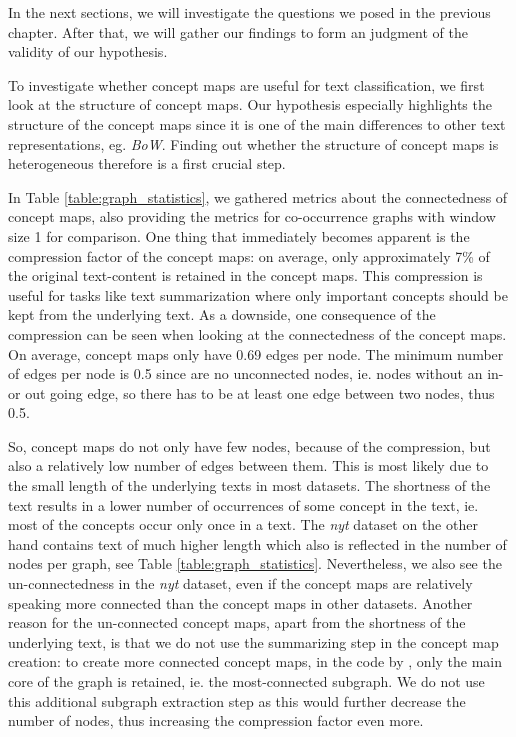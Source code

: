 In the next sections, we will investigate the questions we posed in the previous chapter.
After that, we will gather our findings to form an judgment of the validity of our hypothesis.



To investigate whether concept maps are useful for text classification, we first look at the structure of concept maps.
Our hypothesis especially highlights the structure of the concept maps since it is one of the main differences to other text representations, eg. \textit{BoW}.
Finding out whether the structure of concept maps is heterogeneous therefore is a first crucial step.

In Table \ref{table:graph_statistics}, we gathered metrics about the connectedness of concept maps, also providing the metrics for co-occurrence graphs with window size 1 for comparison.
One thing that immediately becomes apparent is the compression factor of the concept maps: on average, only approximately 7\% of the original text-content is retained in the concept maps.
This compression is useful for tasks like text summarization where only important concepts should be kept from the underlying text.
As a downside, one consequence of the compression can be seen when looking at the connectedness of the concept maps.
On average, concept maps only have 0.69 edges per node. The minimum number of edges per node is 0.5 since are no unconnected nodes, ie. nodes without an in- or out going edge, so there has to be at least one edge between two nodes, thus 0.5.

So, concept maps do not only have few nodes, because of the compression, but also a relatively low number of edges between them.
This is most likely due to the small length of the underlying texts in most datasets.
The shortness of the text results in a lower number of occurrences of some concept in the text, ie. most of the concepts occur only once in a text.
The \textit{nyt} dataset on the other hand contains text of much higher length which also is reflected in the number of nodes per graph, see Table \ref{table:graph_statistics}.
Nevertheless, we also see the un-connectedness in the \textit{nyt} dataset, even if the concept maps are relatively speaking more connected than the concept maps in other datasets.
Another reason for the un-connected concept maps, apart from the shortness of the underlying text, is that we do not use the summarizing step in the concept map creation: to create more connected concept maps, in the code by \cite{Falke2017b}, only the main core of the graph is retained, ie. the  most-connected subgraph.
We do not use this additional subgraph extraction step as this would further decrease the number of nodes, thus increasing the compression factor even more.

